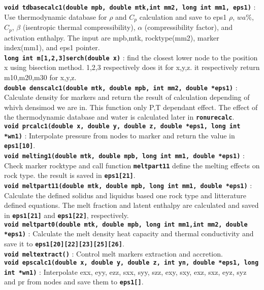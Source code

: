 \textbf{\texttt{void tdbasecalc1(double mpb, double mtk,int mm2, long int mm1, eps1)}} : Use thermodynamic database for $\rho$ and $C_p$ calculation and save to eps1 $\rho$, $wa\%$, $C_p$, $\beta$ (isentropic thermal compressibility), $\alpha$ (compressibility factor), and activation enthalpy. The input are mpb,mtk, rocktype(mm2), marker index(mm1), and eps1 pointer.
\\                                
\textbf{\texttt{long int m[1,2,3]serch(double x)}} : find the closest lower node to the position x using bisection method. 1,2,3 respectively does it for x,y,z. it respectively return m10,m20,m30 for x,y,z. 
\\                              
\textbf{\texttt{double denscalc1(double mtk, double mpb, int mm2, double *eps1)}} : Calculate density for markers and return the result of calculation depending of whivh densimod we are in. This function only P,T dependant effect. The effect of the thermodynamic database and water is calculated later in \textbf{\texttt{ronurecalc}}.  
\\
\textbf{\texttt{void prcalc1(double x, double y, double z, double *eps1, long int *wn1)}} : Interpolate pressure from nodes to marker and return the value in \textbf{\texttt{eps1[10]}}.  
\\
\textbf{\texttt{void melting1(double mtk, double mpb, long int mm1, double *eps1)}} : Check marker rocktype and call function \textbf{\texttt{meltpart11}} define the melting effects on rock type. the result is saved in \textbf{\texttt{eps1[21]}}.  
\\
\textbf{\texttt{void meltpart11(double mtk, double mpb, long int mm1, double *eps1)}} : Calculate the defined solidus and liquidus based one rock type and litterature defined equations. The melt fraction and latent enthalpy are calculated and saved in \textbf{\texttt{eps1[21]}} and \textbf{\texttt{eps1[22]}}, respectively.  
\\
\textbf{\texttt{void meltpart0(double mtk, double mpb, long int mm1,int mm2, double *eps1)}} : Calculate the melt density heat capacity and thermal conductivity and save it to \textbf{\texttt{eps1[20][22][23][25][26]}}.  
\\
\textbf{\texttt{void meltextract()}} : Control melt markers extraction and accretion. 
\\
\textbf{\texttt{void epscalc1(double x, double y, double z, int yn, double *eps1, long int *wn1)}} : Interpolate exx, eyy, ezz, sxx, syy, szz, exy, sxy, exz, sxz, eyz, syz and pr from nodes and save them to \textbf{\texttt{eps1[]}}.  

